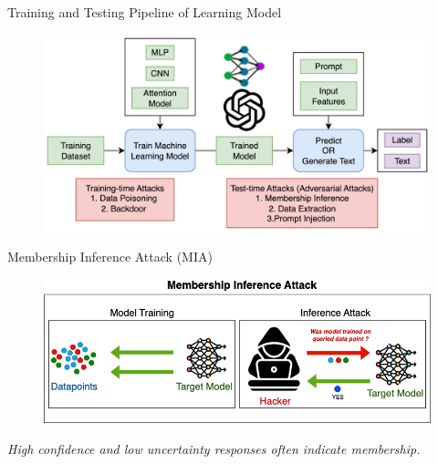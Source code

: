 \documentclass[12pt,aspectratio=169,handout]{beamer}
\begin{document}
\begin{frame}{Training and Testing Pipeline of Learning Model}
\begin{figure}
        \centering
        \includegraphics[width=\linewidth]{img/attacks_llm.png}
    \end{figure}


\end{frame}



\begin{frame}{Membership Inference Attack (MIA)}

    \begin{figure}
        \centering
        \includegraphics[width=\linewidth]{img/mia.png}
    \end{figure}
    \textit{High confidence and low uncertainty responses often indicate membership.}
\end{frame}
\end{document}
